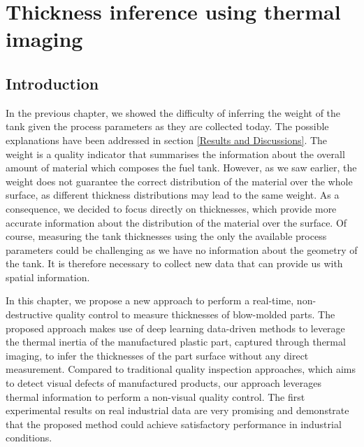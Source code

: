 \chapter{Thickness inference using thermal imaging} \label{Thickness inference using thermal imaging}
\minitoc




\section{Introduction}

In the previous chapter, we showed the difficulty of inferring the weight of the tank given the process parameters as they are collected today. The possible explanations have been addressed in section \ref{Results and Discussions}. The weight is a quality indicator that summarises the information about the overall amount of material which composes the fuel tank. However, as we saw earlier, the weight does not guarantee the correct distribution of the material over the whole surface, as different thickness distributions may lead to the same weight. As a consequence, we decided to focus directly on thicknesses, which provide more accurate information about the distribution of the material over the surface. Of course, measuring the tank thicknesses using the only the available process parameters could be challenging as we have no information about the geometry of the tank. It is therefore necessary to collect new data that can provide us with spatial information.

In this chapter, we propose a new approach to perform a real-time, non-destructive quality control to measure thicknesses of blow-molded parts. The proposed approach makes use of deep learning data-driven methods to leverage the thermal inertia of the manufactured plastic part, captured through thermal imaging, to infer the thicknesses of the part surface without any direct measurement. Compared to traditional quality inspection approaches, which aims to detect visual defects of manufactured products, our approach leverages thermal information to perform a non-visual quality control. The first experimental results on real industrial data are very promising and demonstrate that the proposed method could achieve satisfactory performance in industrial conditions.


